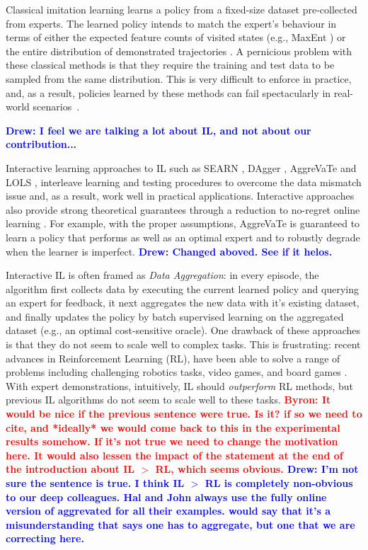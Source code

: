 \documentclass{article}
\newcommand{\BB}[1]{\textcolor{red}{\bf Byron: {#1}}}
\newcommand{\drew}[1]{\textcolor{blue}{\bf Drew: {#1}}}
\begin{document}
Classical imitation learning \cite{abbeel2004apprenticeship,syed2008apprenticeship,ziebart2008maximum,finn2016guided,ho2016generative} learns a policy from a fixed-size dataset pre-collected from experts. The learned policy intends to match the expert's behaviour in terms of either the expected feature counts of visited states (e.g., MaxEnt \cite{ziebart2008maximum}) or the entire distribution of demonstrated trajectories \cite{ho2016generative}. A pernicious problem with these classical methods is that they require the training and test data to be sampled from the same distribution.  This is very difficult to enforce in practice, and, as a result, policies learned by these methods can fail spectacularly in real-world scenarios~\cite{ross2010efficient}.

\drew{I feel we are talking a lot about IL, and not about our contribution...}

Interactive learning approaches to IL such as SEARN \cite{daume2009search}, DAgger \cite{Ross2011_AISTATS}, AggreVaTe \cite{ross2014reinforcement} and LOLS \cite{chang2015learning}, interleave learning and testing procedures to overcome the data mismatch issue and, as a result, work well in practical applications. 
Interactive approaches also provide strong theoretical guarantees through a reduction to no-regret online learning \cite{Zinkevich2003_ICML,shalev2012online}. For example, with the proper assumptions, AggreVaTe \cite{ross2014reinforcement} is guaranteed to learn a policy that performs as well as an optimal expert and to robustly degrade when the learner is imperfect.%
\drew{Changed aboved. See if it helos.}

Interactive IL is often framed as \emph{Data Aggregation}: in every episode, the algorithm first collects data by executing the current learned policy and querying an expert for feedback, it next aggregates the new data with it's existing dataset, and finally updates the policy by batch supervised learning on the aggregated dataset (e.g., an optimal cost-sensitive oracle). One drawback of these approaches is that they do not seem to scale well to complex tasks. This is frustrating: recent advances in Reinforcement Learning (RL), have been able to solve a range of problems including challenging robotics tasks, video games, and board games \cite{schulman2015trust,duan2016benchmarking,silver2016mastering}. With expert demonstrations, intuitively, IL should \emph{outperform} RL methods, but previous IL algorithms do not seem to scale well to these tasks. \BB{It would be nice if the previous sentence were true. Is it? if so we need to cite, and *ideally* we would come back to this in the experimental results somehow. If it's not true we need to change the motivation here. It would also lessen the impact of the statement at the end of the introduction about IL $>$ RL, which seems obvious. }
\drew{I'm not sure the sentence is true. I think IL $>$ RL is completely non-obvious to our deep colleagues. Hal and John always use the fully online version of aggrevated for all their examples.  would say that it's a misunderstanding that says one has to aggregate, but one that we are correcting here.}
\end{document}
